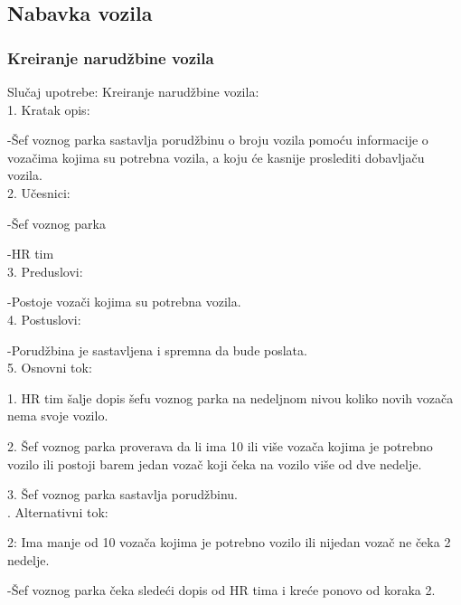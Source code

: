 \newpage

\subsection{\bfseries Nabavka vozila}

\subsubsection{\bfseries Kreiranje narudžbine vozila}
\noindent Slučaj upotrebe: Kreiranje narudžbine vozila:\\
1. Kratak opis:
\par -Šef voznog parka sastavlja porudžbinu o broju vozila pomoću informacije o vozačima kojima su potrebna vozila, a koju će kasnije proslediti dobavljaču vozila.\\
2. Učesnici:
\par -Šef voznog parka
\par -HR tim\\
3. Preduslovi:
\par -Postoje vozači kojima su potrebna vozila.\\
4. Postuslovi:
\par -Porudžbina je sastavljena i spremna da bude poslata.\\
5. Osnovni tok:
\par 1. HR tim šalje dopis šefu voznog parka na nedeljnom nivou koliko novih vozača nema svoje vozilo.
\par 2. Šef voznog parka proverava da li ima 10 ili više vozača kojima je potrebno vozilo ili postoji barem jedan vozač koji čeka na vozilo više od dve nedelje.
\par 3. Šef voznog parka sastavlja porudžbinu.\\

. Alternativni tok:
\par 2: Ima manje od 10 vozača kojima je potrebno vozilo ili nijedan vozač ne čeka 2 nedelje.
\par -Šef voznog parka čeka sledeći dopis od HR tima i kreće ponovo od koraka 2.


